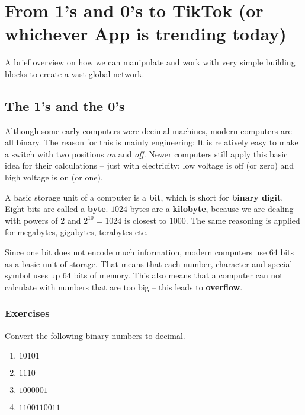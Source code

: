 \documentclass[11pt,a4paper]{report}
\newcommand{\bfb}[1]{{\bf \color{blue} #1}}
\begin{document}
\section*{From 1's and 0's to TikTok (or whichever App is trending today)}
\setcounter{section}{1}
A brief overview on how we can manipulate and work with very simple building blocks to create a vast global network. 
\subsection{The 1's and the 0's}
Although some early computers were decimal machines, modern  computers are all binary. The reason for this is mainly engineering: It is relatively easy to make a switch with two positions \emph{on} and \emph{off}. Newer computers still apply this basic idea for their calculations -- just with electricity: low voltage is off (or zero) and high voltage is on (or one).

A basic storage unit of a computer is a \bfb{bit}, which is short for \bfb{binary digit}. Eight bits are called a \bfb{byte}. $1024$ bytes are a \bfb{kilobyte}, because we are dealing with powers of $2$ and $2^{10}=1024$ is closest to $1000$. The same reasoning is applied for megabytes, gigabytes, terabytes etc. 

Since one bit does not encode much information, modern computers use $64$ bits as a basic unit of storage. That means that each number, character and special symbol uses up $64$ bits of memory. This also means that a computer can not calculate with numbers that are too big -- this leads to \bfb{overflow}.

\subsubsection{Exercises}

\begin{ex}
Convert the following binary numbers to decimal.
\begin{multicols}{4}
\begin{enumerate}
\item $10101$
\item $1110$
\item $1000001$
\item $1100110011$
\end{enumerate}
\end{multicols} 
\end{ex}
\end{document}
